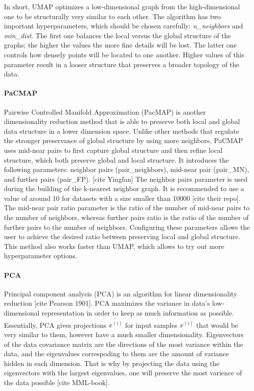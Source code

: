 In short, UMAP optimizes a low-dimensional graph from the high-dimensional one to be structurally very similar to each other. The algorithm has two important hyperparameters, which should be chosen carefully: \textit{n\_neighbors} and \textit{min\_dist}. The first one balances the local versus the global structure of the graphs; the higher the values the more fine details will be lost. The latter one controls how densely points will be located to one another. Higher values of this parameter result in a looser structure that preserves a broader topology of the data. 

\paragraph{PaCMAP}\label{section:pacmap}
Pairwise Controlled Manifold Approximation (PacMAP) is another dimensionality reduction method that is able to preserve both local and global data structure in a lower dimension space. Unlike other methods that regulate the stronger preservance of global structure by using more neighbors, PaCMAP uses mid-near pairs to first capture global structure and then refine local structure, which both preserve global and local structure. It introduces the following parameters: neighbor pairs (pair\_neighbors), mid-near pair (pair\_MN), and further pairs (pair\_FP). [cite Yingfan] The neighbor pairs parameter is used during the building of the k-nearest neighbor graph. It is recommended to use a value of around 10 for datasets with a size smaller than 10000 [cite their repo]. The mid-near pair ratio parameter is the ratio of the number of mid-near pairs to the number of neighbors, whereas further pairs ratio is the ratio of the number of further pairs to the number of neighbors. Configuring these parameters allows the user to achieve the desired ratio between preserving local and global structure. This method also works faster than UMAP, which allows to try out more hyperparameter options.

\paragraph{PCA}
Principal component analysis (PCA) is an algorithm for linear dimensionality reduction [cite Pearson 1901].  PCA maximizes the variance in data's low-dimensional representation in order to keep as much information as possible. Essentially, PCA gives projections $\tilde{x^{(i)}}$ for input samples $x^{(i)}$ that would be very similar to them, however have a much smaller dimensionality. Eigenvectors of the data covariance matrix are the directions of the most variance within the data, and the eigenvalues correspoding to them are the amount of variance hidden in each dimension. That is why by projecting the data using the eigenvectors with the largest eigenvalues, one will preserve the most varience of the data possible [cite MML-book].

